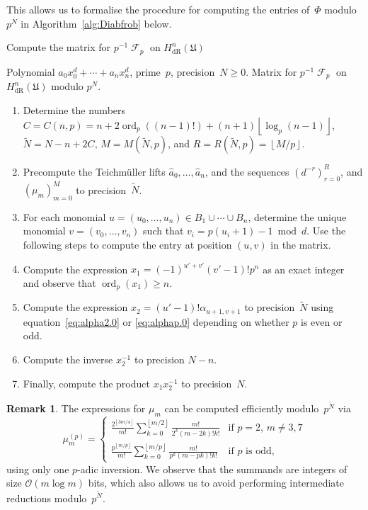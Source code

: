 \documentclass[a4paper,11pt]{article}
\numberwithin{equation}{section}
\providecommand{\floor}[1]{\left\lfloor#1\right\rfloor}   %
\DeclareMathOperator{\ord}{ord}          %
\DeclareMathOperator{\Frob}{\mathcal{F}} %
\providecommand{\HdR}{H_{\text{dR}}}    %
\providecommand{\BigOh}{\mathcal{O}} %
\theoremstyle{definition}
\newtheorem{rem}[thm]{Remark}
\begin{document}
This allows us to formalise the procedure for computing the 
entries of~$\Phi$ modulo~$p^N$ in Algorithm~\ref{alg:Diabfrob} 
below.

\begin{algorithm}
\caption{Compute the matrix for $p^{-1} \Frob_p$ on $\HdR^n(\mathfrak{U})$}
\label{alg:Diabfrob}
\begin{algorithmic}
\vspace{1mm}
\Require Polynomial $a_0 x_0^d + \dotsb + a_n x_n^d$, 
         prime~$p$, precision~$N \geq 0$.
\Ensure  Matrix for $p^{-1} \Frob_p$ on $\HdR^n(\mathfrak{U})$ modulo $p^N$.
\begin{enumerate}
\item Determine the numbers 
      $C = C(n,p) = n + 2 \ord_p((n-1)!) + (n+1) \floor{\log_p(n-1)}$, 
      $\tilde{N} = N - n + 2 C$, $M = M(\tilde{N}, p)$, and 
      $R = R(\tilde{N}, p) = \floor{M/p}$.
\item Precompute the Teichm\"uller lifts $\hat{a}_0, \dotsc, \hat{a}_n$, 
      and the sequences $(d^{-r})_{r=0}^R$, and $(\mu_m)_{m=0}^{M}$ 
      to precision~$\tilde{N}$.
\item For each monomial $u = (u_0, \dotsc, u_n) \in B_1 \cup \dotsb \cup B_n$, 
      determine the unique monomial $v = (v_0, \dotsc, v_n)$ such that 
      $v_i = p (u_i + 1) - 1 \bmod{d}$.  Use the following steps to 
      compute the entry at position $(u,v)$ in the matrix.
\item Compute the expression $x_1 = (-1)^{u'+v'} (v'-1)! p^n$ as an 
      exact integer and observe that \mbox{$\ord_p(x_1) \geq n$}.
\item Compute the expression $x_2 = (u' - 1)! \alpha_{u+1,v+1}$ to 
      precision~$\tilde{N}$ using equation~\eqref{eq:alpha2.0} or 
      \eqref{eq:alphap.0} depending on whether $p$ is even or odd. 
\item Compute the inverse $x_2^{-1}$ to precision $N - n$.
\item Finally, compute the product $x_1 x_2^{-1}$ to precision~$N$.
\end{enumerate}
\EndProcedure
\end{algorithmic}
\end{algorithm}

\begin{rem} \label{rem:mup}
The expressions for $\mu_m$ can be computed efficiently 
modulo~$p^{\tilde{N}}$ via 
\begin{equation}
\mu_m^{(p)} = \begin{cases}
\frac{2^{\floor{3m/4}}}{m!} 
    \sum_{k=0}^{\floor{m/2}} \frac{m!}{2^k (m-2k)! k!}
    & \text{if $p = 2$, $m \neq 3, 7$} \\
\frac{p^{\floor{m/p}}}{m!} 
    \sum_{k=0}^{\floor{m/p}} \frac{m!}{p^k (m-pk)! k!}
    & \text{if $p$ is odd},
\end{cases}
\end{equation}
using only one $p$-adic inversion.  We observe that the summands are 
integers of size $\BigOh(m \log m)$ bits, which also allows us to 
avoid performing intermediate reductions modulo~$p^{\tilde{N}}$.
\end{rem}
\end{document}
